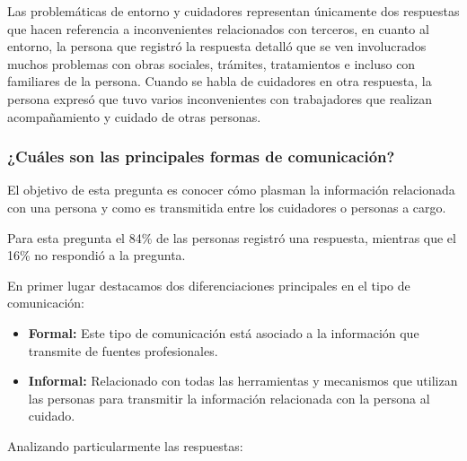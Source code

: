 \documentclass[a4paper,12pt]{article}
\begin{document}
    \par Las problemáticas de entorno y cuidadores representan únicamente dos respuestas que hacen referencia a inconvenientes relacionados con terceros, en cuanto al entorno, la persona que registró la respuesta detalló que se ven involucrados muchos problemas con obras sociales, trámites, tratamientos e incluso con familiares de la persona. Cuando se habla de cuidadores en otra respuesta, la persona expresó que tuvo varios inconvenientes con trabajadores que realizan acompañamiento y cuidado de otras personas.
    \subsubsection{¿Cuáles son las principales formas de comunicación?}
    \par El objetivo de esta pregunta es conocer cómo plasman la información relacionada con una persona y como es transmitida entre los cuidadores o personas a cargo.
    \par Para esta pregunta el 84\% de las personas registró una respuesta, mientras que el 16\% no respondió a la pregunta. 
    \newline
    \newline
    \par En primer lugar destacamos dos diferenciaciones principales en el tipo de comunicación:
    \begin{itemize}
        \item \textbf{Formal:} Este tipo de comunicación está asociado a la información que transmite de fuentes profesionales.
        \item \textbf{Informal:} Relacionado con todas las herramientas y mecanismos que utilizan las personas para transmitir la información relacionada con la persona al cuidado.
    \end{itemize}
    \par Analizando particularmente las respuestas:
\end{document}
